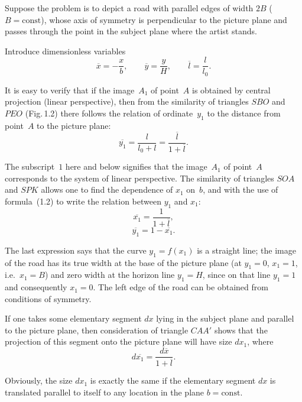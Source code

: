 
Suppose the problem is to depict a road with parallel edges of width $2B$
($B = \mathrm{const}$), whose axis of symmetry is perpendicular to the picture plane and
passes through the point in the subject plane where the artist stands.

Introduce dimensionless variables
\begin{equation}
  \overline{x} = -\frac{x}{b}, \qquad \overline{y} = \frac{y}{H}, \qquad \overline{l} = \frac{l}{l_0}.
  \tag{1.1}
\end{equation}

It is easy to verify that if the image~$A_1$ of point~$A$ is obtained by central projection
(linear perspective), then from the similarity of triangles $SBO$ and $PEO$ (Fig.\,1.2) there
follows the relation of ordinate~$y_1$ to the distance from point~$A$ to the picture plane:
\begin{equation}
  \overline{y_1} = \frac{l}{l_0 + l} = \frac{\overline{l}}{1+\overline{l}}.
  \tag{1.2}
\end{equation}

The subscript~$1$ here and below signifies that the image~$A_1$ of point~$A$ corresponds to
the system of linear perspective.  The similarity of triangles $SOA$ and $SPK$ allows one to
find the dependence of $x_1$ on~$b$, and with the use of formula~(1.2) to write the relation
between $y_1$ and $x_1$:
\begin{equation}
  \overline{x_1} = \frac{1}{1+\overline{l}},
  \tag{1.3}
\end{equation}
\begin{equation}
  \overline{y_1} = 1 - \overline{x_1}.
  \tag{1.4}
\end{equation}

The last expression says that the curve $y_1 = f(x_1)$ is a straight line; the image of the
road has its true width at the base of the picture plane (at $y_1 = 0$, $x_1 = 1$, i.e.\
$x_1 = B$) and zero width at the horizon line $y_1 = H$, since on that line $y_1 = 1$ and
consequently $x_1 = 0$.  The left edge of the road can be obtained from conditions of
symmetry.

If one takes some elementary segment $dx$ lying in the subject plane and parallel to the
picture plane, then consideration of triangle $CAA'$ shows that the projection of this
segment onto the picture plane will have size $dx_1$, where
\begin{equation}
  d\overline{x_1} = \frac{d\overline{x}}{1+\overline{l}}.
  \tag{1.5}
\end{equation}

Obviously, the size $dx_1$ is exactly the same if the elementary segment $dx$ is translated
parallel to itself to any location in the plane $b = \mathrm{const}$.

